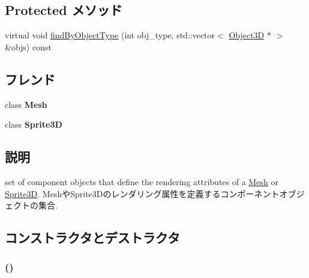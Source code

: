 \subsection*{Protected メソッド}
\begin{CompactItemize}
\item 
virtual void \hyperlink{classm3g_1_1Appearance_4dadb21b568b0230fac106f15040138c}{findByObjectType} (int obj\_\-type, std::vector$<$ \hyperlink{classm3g_1_1Object3D}{Object3D} $\ast$ $>$ \&objs) const 
\end{CompactItemize}
\subsection*{フレンド}
\begin{CompactItemize}
\item 
\hypertarget{classm3g_1_1Appearance_a41a130f156b145bffb3f4b5172c4c93}{
class \textbf{Mesh}}
\label{classm3g_1_1Appearance_a41a130f156b145bffb3f4b5172c4c93}

\item 
\hypertarget{classm3g_1_1Appearance_639cf38c41878a4f0fc8d24c010c96de}{
class \textbf{Sprite3D}}
\label{classm3g_1_1Appearance_639cf38c41878a4f0fc8d24c010c96de}

\end{CompactItemize}


\subsection{説明}
set of component objects that define the rendering attributes of a \hyperlink{classm3g_1_1Mesh}{Mesh} or \hyperlink{classm3g_1_1Sprite3D}{Sprite3D}. MeshやSprite3Dのレンダリング属性を定義するコンポーネントオブジェクトの集合. 

\subsection{コンストラクタとデストラクタ}
\hypertarget{classm3g_1_1Appearance_2e594c7b96cb5cfad839a98b57f5d42f}{
\subsubsection[{Appearance}]{ ()}}
\label{classm3g_1_1Appearance_2e594c7b96cb5cfad839a98b57f5d42f}


